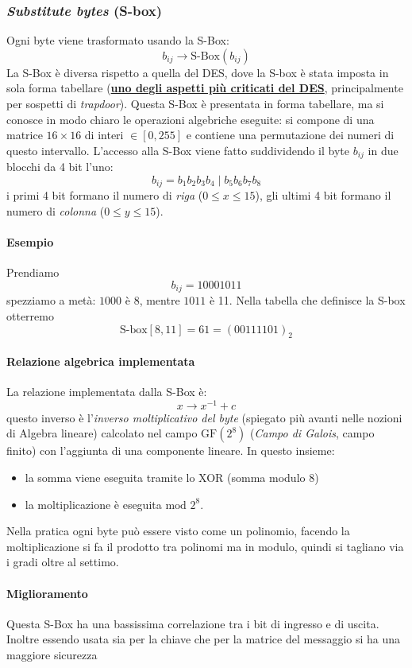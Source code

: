 \subsubsection{\emph{Substitute bytes} (S-box)}
Ogni byte viene trasformato usando la S-Box:
$$ b_{ij} \xrightarrow{} \text{S-Box}(b_{ij}) $$
La S-Box è diversa rispetto a quella del DES, dove la S-box è stata imposta in sola forma tabellare (\textbf{\underline{uno degli aspetti più criticati del DES}}, principalmente per sospetti di \emph{trapdoor}). Questa S-Box è presentata in forma tabellare, ma si conosce in modo chiaro le operazioni algebriche eseguite: si compone di una matrice $16 \times 16$ di interi $\in [0, 255]$ e contiene una permutazione dei numeri di questo intervallo.
L'accesso alla S-Box viene fatto suddividendo il byte $b_{ij}$ in due blocchi da 4 bit l'uno:
$$ b_{ij} = b_{1}b_{2}b_{3}b_{4} \mid b_{5}b_{6}b_{7}b_{8} $$
i primi 4 bit formano il numero di \emph{riga} ($0 \leq x \leq 15$), gli ultimi 4 bit formano il numero di \emph{colonna} ($0 \leq y \leq 15$).
\paragraph{Esempio} Prendiamo
$$ b_{ij} = 10001011 $$
spezziamo a metà: $1000$ è $8$, mentre $1011$ è 11. Nella tabella che definisce la S-box otterremo
$$\text{S-box}[8,11]=61=(00111101)_2$$
\paragraph{Relazione algebrica implementata} La relazione implementata dalla S-Box è:
$$ x \xrightarrow{} x^{-1} + c $$
questo inverso è l'\textit{inverso moltiplicativo del byte} (spiegato più avanti nelle nozioni di Algebra lineare) calcolato nel campo $\text{GF}(2^{8})$ (\textit{Campo di Galois}, campo finito) con l'aggiunta di una componente lineare. In questo insieme:
\begin{itemize}
	\item la somma viene eseguita tramite lo XOR (somma modulo 8)
	\item la moltiplicazione è eseguita $\text{mod } 2^{8}$.
\end{itemize}
Nella pratica ogni byte può essere visto come un polinomio, facendo la moltiplicazione si fa il prodotto tra polinomi ma in modulo, quindi si tagliano via i gradi oltre al settimo. 
\paragraph{Miglioramento} Questa S-Box ha una bassissima correlazione tra i bit di ingresso e di uscita. Inoltre essendo usata sia per la chiave che per la matrice del messaggio si ha una maggiore sicurezza



